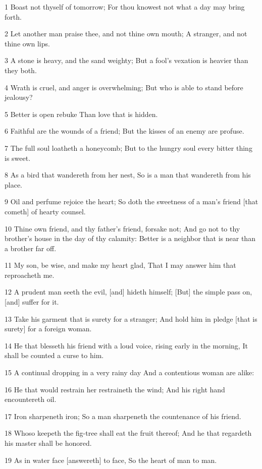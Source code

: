 \par 1 Boast not thyself of tomorrow; For thou knowest not what a day may bring forth.
\par 2 Let another man praise thee, and not thine own mouth; A stranger, and not thine own lips.
\par 3 A stone is heavy, and the sand weighty; But a fool's vexation is heavier than they both.
\par 4 Wrath is cruel, and anger is overwhelming; But who is able to stand before jealousy?
\par 5 Better is open rebuke Than love that is hidden.
\par 6 Faithful are the wounds of a friend; But the kisses of an enemy are profuse.
\par 7 The full soul loatheth a honeycomb; But to the hungry soul every bitter thing is sweet.
\par 8 As a bird that wandereth from her nest, So is a man that wandereth from his place.
\par 9 Oil and perfume rejoice the heart; So doth the sweetness of a man's friend [that cometh] of hearty counsel.
\par 10 Thine own friend, and thy father's friend, forsake not; And go not to thy brother's house in the day of thy calamity: Better is a neighbor that is near than a brother far off.
\par 11 My son, be wise, and make my heart glad, That I may answer him that reproacheth me.
\par 12 A prudent man seeth the evil, [and] hideth himself; [But] the simple pass on, [and] suffer for it.
\par 13 Take his garment that is surety for a stranger; And hold him in pledge [that is surety] for a foreign woman.
\par 14 He that blesseth his friend with a loud voice, rising early in the morning, It shall be counted a curse to him.
\par 15 A continual dropping in a very rainy day And a contentious woman are alike:
\par 16 He that would restrain her restraineth the wind; And his right hand encountereth oil.
\par 17 Iron sharpeneth iron; So a man sharpeneth the countenance of his friend.
\par 18 Whoso keepeth the fig-tree shall eat the fruit thereof; And he that regardeth his master shall be honored.
\par 19 As in water face [answereth] to face, So the heart of man to man.
